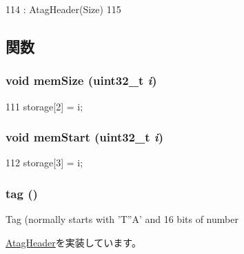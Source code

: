 \begin{DoxyCode}
114         : AtagHeader(Size)
115     {}
\end{DoxyCode}


\subsection{関数}
\hypertarget{classAtagMem_a90062018f5fdfc088eec2f2de8e85aa2}{
\subsubsection[{memSize}]{\setlength{\rightskip}{0pt plus 5cm}void memSize ({\bf uint32\_\-t} {\em i})}}
\label{classAtagMem_a90062018f5fdfc088eec2f2de8e85aa2}



\begin{DoxyCode}
111 { storage[2] = i; }
\end{DoxyCode}
\hypertarget{classAtagMem_a1cac14faf981166796e6deb5c3d2dbdc}{
\subsubsection[{memStart}]{\setlength{\rightskip}{0pt plus 5cm}void memStart ({\bf uint32\_\-t} {\em i})}}
\label{classAtagMem_a1cac14faf981166796e6deb5c3d2dbdc}



\begin{DoxyCode}
112 { storage[3] = i; }
\end{DoxyCode}
\hypertarget{classAtagMem_afe29fbb80b1d2765e37e98c6d259ea52}{
\subsubsection[{tag}]{ tag ()}}
\label{classAtagMem_afe29fbb80b1d2765e37e98c6d259ea52}
Tag (normally starts with 'T''A' and 16 bits of number 

\hyperlink{classAtagHeader_adad80b4c3e973afddab9e70f05faecd9}{AtagHeader}を実装しています。


